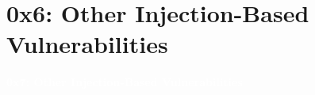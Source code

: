 \documentclass[aspectratio=169]{beamer}
\begin{document}
\section{0x6: Other Injection-Based Vulnerabilities}
{
\begin{frame}
\huge{\textcolor{white}{\textbf{0x7: Other Injection-Based Vulnerabilities}}}
\end{frame}
}
\end{document}
